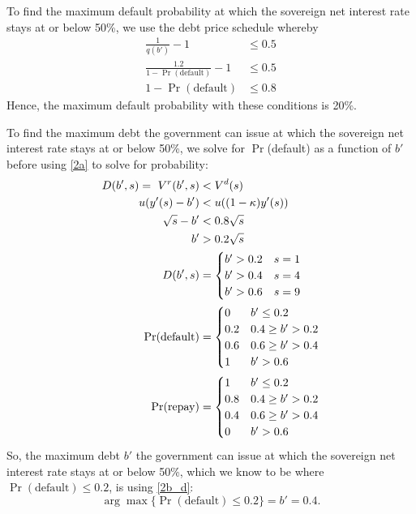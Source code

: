 \documentclass[12pt]{article}
\begin{document}
\begin{enumerate}
\begin{enumerate}[label=(\alph*)]
        To find the maximum default probability  at which the sovereign net interest rate stays at or below 50\%, we use the debt price schedule whereby 
         \begin{align*}
              \frac{1}{q(b')}-1 &\leq 0.5
              \\ \frac{1.2}{1-\Pr(\text{default})} -1&\leq 0.5
              \\ 1-\Pr(\text{default})&\leq 0.8
         \end{align*}
        Hence, the maximum default probability with these conditions is 20\%.      
        
        To find the maximum debt the government can issue at which the sovereign net interest rate stays at or below 50\%, we solve for $\Pr$(default) as a function of $b'$ before using \eqref{2a} to solve for probability:
        \begin{align}
            D(b',s) = \ V^r(b',s) &< V^d(s)\notag
            \\ u(y'(s) - b') &< u((1-\kappa)y'(s))\notag
            \\ \sqrt{s} - b' &< 0.8\sqrt{s}\notag
            \\ b' &> 0.2\sqrt{s}\notag
            \\ D(b',s) &= \begin{cases}
                b' > 0.2 & s=1
                \\ b' > 0.4& s=4
                \\ b' > 0.6& s=9
            \end{cases} \notag
            \\ \Pr(\text{default}) &= \begin{cases}
                0 & b' \leq 0.2
                \\ 0.2 & 0.4 \geq b' > 0.2 
                \\ 0.6 &0.6 \geq b' > 0.4
                \\ 1 & b' > 0.6
            \end{cases} \label{2b_d}
            \\ \Pr(\text{repay}) &= \begin{cases}
                1 & b' \leq 0.2
                \\ 0.8 & 0.4 \geq b' > 0.2 
                \\ 0.4 &0.6 \geq b' > 0.4
                \\ 0 & b' > 0.6
            \end{cases}\label{2b_r}
        \end{align}
        So, the maximum debt $b'$  the government can issue at which the sovereign net interest rate stays at or below 50\%, which we know to be where $\Pr(\text{default})\leq 0.2$, is using \eqref{2b_d}:
        \[ \arg\max \{\Pr(\text{default})\leq 0.2\}= \boxed{b' = 0.4}.\]


\end{enumerate}
\end{enumerate}
\end{document}
